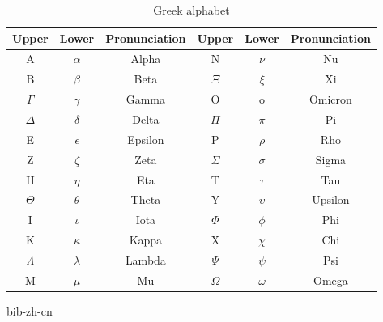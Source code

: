 \documentclass[b5paper]{article}
\begin{document}
 \begin{table}[htbp]
     \centering
     \begin{tabular}{|c|c|c||c|c|c|}
         \hline
               \textbf{Upper} & \textbf{Lower} & \textbf{Pronunciation} & \textbf{Upper} & \textbf{Lower} & \textbf{Pronunciation} \\
         \hline
         A         & $\alpha$    & Alpha &      N         & $\nu$         & Nu \\
         B         & $\beta$     & Beta &       $\Xi$         & $\xi$         & Xi \\
         $\Gamma$  & $\gamma$    & Gamma &      O    & o    & Omicron \\
         $\Delta$  & $\delta$    & Delta &      $\Pi$         & $\pi$         & Pi \\
         E         & $\epsilon$  & Epsilon &    P        & $\rho$        & Rho \\
         Z         & $\zeta$     & Zeta &       $\Sigma$      & $\sigma$      & Sigma \\
         H         & $\eta$      & Eta &        T        & $\tau$        & Tau \\
         $\Theta$  & $\theta$    & Theta &      Y    & $\upsilon$    & Upsilon \\
         I         & $\iota$     & Iota &       $\Phi$        & $\phi$        & Phi \\
         K         & $\kappa$    & Kappa &      X        & $\chi$        & Chi \\
         $\Lambda$ & $\lambda$   & Lambda &     $\Psi$        & $\psi$        & Psi \\
         M         & $\mu$       & Mu &         $\Omega$      & $\omega$      & Omega \\
         \hline
     \end{tabular}
     \caption{Greek alphabet}
     \label{tab:greek-alphabet}
 \end{table}

\begin{thebibliography}{99}
{bib-zh-cn}
\end{thebibliography}

\expandafter\enddocument
\fi
\end{document}
